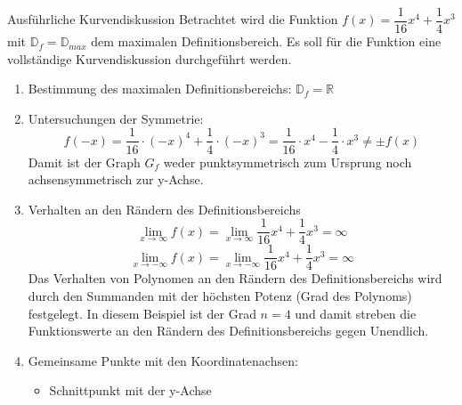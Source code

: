 \begin{bsp}{Ausführliche Kurvendiskussion}{}
Betrachtet wird die Funktion $f(x)= \dfrac{1}{16} x^4 +\dfrac{1}{4} x^3$ mit $\mathds{D}_f =\mathds{D}_{max}$ dem maximalen Definitionsbereich. Es soll für die Funktion eine vollständige Kurvendiskussion durchgeführt werden.
\begin{enumerate}
    \item Bestimmung des maximalen Definitionsbereichs: $\mathds{D}_f = \mathds{R}$
    \item Untersuchungen der Symmetrie:
    $$f(-x) = \frac{1}{16} \cdot (-x)^4 + \frac{1}{4} \cdot (-x)^3 = \frac{1}{16} \cdot x^4 - \frac{1}{4} \cdot x^3 \neq \pm f(x)$$ Damit ist der Graph $G_f$ weder punktsymmetrisch zum Ursprung noch achsensymmetrisch zur y-Achse.
    \item Verhalten an den Rändern des Definitionsbereichs
    $$\lim_{x\rightarrow \infty} f(x) = \lim_{x\rightarrow \infty} \dfrac{1}{16}x^4 +\dfrac{1}{4}x^3 = \infty$$
        $$\lim_{x\rightarrow -\infty} f(x) = \lim_{x\rightarrow -\infty} \dfrac{1}{16}x^4 +\dfrac{1}{4}x^3 = \infty$$
        Das Verhalten von Polynomen an den Rändern des Definitionsbereichs wird durch den Summanden mit der höchsten Potenz (Grad des Polynoms) festgelegt. In diesem Beispiel ist der Grad $n=4$ und damit streben die Funktionswerte an den Rändern des Definitionsbereichs gegen Unendlich.
    \item Gemeinsame Punkte mit den Koordinatenachsen:
    \begin{itemize}
        \item Schnittpunkt mit der y-Achse
    

\end{itemize}
\end{enumerate}
\end{bsp}
